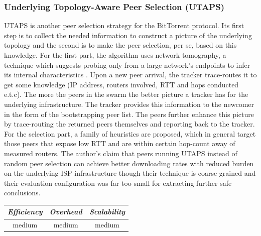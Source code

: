 \subsubsection{Underlying Topology-Aware Peer Selection (UTAPS)}
UTAPS \cite{LCY2008} is another peer selection strategy for the BitTorrent
protocol. Its first step is to collect the needed information to
construct a picture of the underlying topology and the second is to make the
peer selection, per se, based on this knowledge. For the first part, the
algorithm uses network tomography, a technique which suggests probing only
from a large network's endpoints to infer its internal characteristics
\cite{chny_tomography_2002}. Upon a new peer arrival, the tracker trace-routes
it to get some knowledge (IP address, routers involved, RTT and hops conducted
e.t.c). The more the peers in the swarm the better picture a tracker has for the
underlying infrastructure.  The tracker provides this information to the newcomer
in the form
of the bootstrapping peer list. The peers further enhance this picture by
trace-routing the returned peers themselves and reporting back to the tracker.
For the selection part, a family of heuristics are proposed, which in general
target those peers that expose low RTT and are within certain hop-count away of
measured routers. The author's claim that peers running UTAPS instead of random
peer selection can achieve better downloading rates with reduced burden on the
underlying ISP infrastructure though their technique is coarse-grained and their
evaluation configuration was far too small for extracting further safe
conclusions.

\begin{center}
\begin{tabular}{ccc}
\emph{Efficiency} & \emph{Overhead} & \emph{Scalability} \\
\hline
medium &
medium &
%
medium
\end{tabular}
\end{center}

